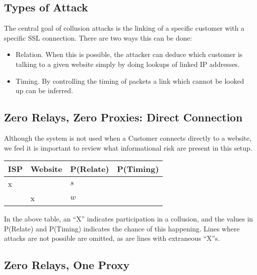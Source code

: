 \subsection{Types of Attack}

The central goal of collusion attacks is the linking of a specific
\Orchid{} customer with a specific SSL connection. There are two ways
this can be done:

\begin{itemize}
\item Relation. When this is possible, the attacker can deduce which
  customer is talking to a given website simply by doing lookups of
  linked IP addresses.
\item Timing. By controlling the timing of packets a link which cannot
  be looked up can be inferred.
\end{itemize}

\subsection{Zero Relays, Zero Proxies: Direct Connection}

Although the \Orchid{} system is not used when a Customer connects
directly to a website, we feel it is important to review what
informational risk are present in this setup.

\begin{center}
\begin{tabular}{l | l | l | l}
  ISP & Website & P(Relate)          & P(Timing) \\
  \hline
  x   &         & $s$                & \\
  \hline
      & x       & $w$                & \\
\end{tabular}
\end{center}


In the above table, an ``X'' indicates participation in a collusion,
and the values in P(Relate) and P(Timing) indicates the chance of this
happening. Lines where attacks are not possible are omitted, as are
lines with extraneous ``X''s.

\subsection{Zero Relays, One Proxy}

